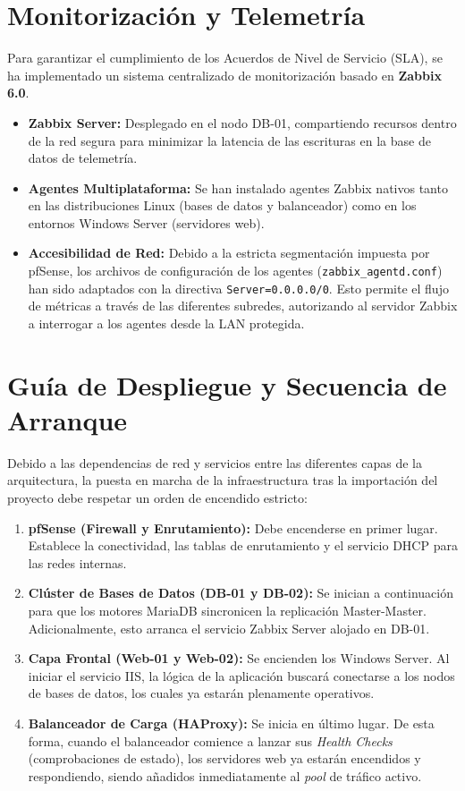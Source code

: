 \documentclass[12pt,a4paper]{article}
\begin{document}
\section{Monitorización y Telemetría}
\label{sec:Monitorizacion}
Para garantizar el cumplimiento de los Acuerdos de Nivel de Servicio (SLA), se ha implementado un sistema centralizado de monitorización basado en \textbf{Zabbix 6.0}.
\begin{itemize}
    \item \textbf{Zabbix Server:} Desplegado en el nodo DB-01, compartiendo recursos dentro de la red segura para minimizar la latencia de las escrituras en la base de datos de telemetría.
    \item \textbf{Agentes Multiplataforma:} Se han instalado agentes Zabbix nativos tanto en las distribuciones Linux (bases de datos y balanceador) como en los entornos Windows Server (servidores web).
    \item \textbf{Accesibilidad de Red:} Debido a la estricta segmentación impuesta por pfSense, los archivos de configuración de los agentes (\texttt{zabbix\_agentd.conf}) han sido adaptados con la directiva \texttt{Server=0.0.0.0/0}. Esto permite el flujo de métricas a través de las diferentes subredes, autorizando al servidor Zabbix a interrogar a los agentes desde la LAN protegida.
\end{itemize}

\section{Guía de Despliegue y Secuencia de Arranque}
\label{sec:Despliegue}
Debido a las dependencias de red y servicios entre las diferentes capas de la arquitectura, la puesta en marcha de la infraestructura tras la importación del proyecto debe respetar un orden de encendido estricto:
\begin{enumerate}
    \item \textbf{pfSense (Firewall y Enrutamiento):} Debe encenderse en primer lugar. Establece la conectividad, las tablas de enrutamiento y el servicio DHCP para las redes internas.
    \item \textbf{Clúster de Bases de Datos (DB-01 y DB-02):} Se inician a continuación para que los motores MariaDB sincronicen la replicación Master-Master. Adicionalmente, esto arranca el servicio Zabbix Server alojado en DB-01.
    \item \textbf{Capa Frontal (Web-01 y Web-02):} Se encienden los Windows Server. Al iniciar el servicio IIS, la lógica de la aplicación buscará conectarse a los nodos de bases de datos, los cuales ya estarán plenamente operativos.
    \item \textbf{Balanceador de Carga (HAProxy):} Se inicia en último lugar. De esta forma, cuando el balanceador comience a lanzar sus \textit{Health Checks} (comprobaciones de estado), los servidores web ya estarán encendidos y respondiendo, siendo añadidos inmediatamente al \textit{pool} de tráfico activo.
\end{enumerate}
\end{document}
